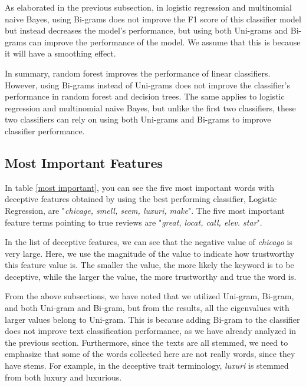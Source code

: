 \documentclass[a4paper, 11pt]{article}
\begin{document}
\begin{multicols}{2}
As elaborated in the previous subsection, in logistic regression and multinomial naive Bayes, using Bi-grams does not improve the F1 score of this classifier model but instead decreases the model's performance, but using both Uni-grams and Bi-grams can improve the performance of the model. We assume that this is because it will have a smoothing effect.

In summary, random forest improves the performance of linear classifiers. However, using Bi-grams instead of Uni-grams does not improve the classifier's performance in random forest and decision trees. The same applies to logistic regression and multinomial naive Bayes, but unlike the first two classifiers, these two classifiers can rely on using both Uni-grams and Bi-grams to improve classifier performance.

\subsection{Most Important Features}

In table \ref{most important}, you can see the five most important words with deceptive features obtained by using the best performing classifier, Logistic Regression, are "\emph{chicage, smell, seem, luxuri, make}". The five most important feature terms pointing to true reviews are "\emph{great, locat, call, elev. star}". 

In the list of deceptive features, we can see that the negative value of \emph{chicago} is very large. Here, we use the magnitude of the value to indicate how trustworthy this feature value is. The smaller the value, the more likely the keyword is to be deceptive, while the larger the value, the more trustworthy and true the word is. 

From the above subsections, we have noted that we utilized Uni-gram, Bi-gram, and both Uni-gram and Bi-gram, but from the results, all the eigenvalues with larger values belong to Uni-gram. This is because adding Bi-gram to the classifier does not improve text classification performance, as we have already analyzed in the previous section. Furthermore, since the texts are all stemmed, we need to emphasize that some of the words collected here are not really words, since they have stems. For example, in the deceptive trait terminology, \emph{luxuri} is stemmed from both luxury and luxurious.

\end{multicols}
\end{document}
